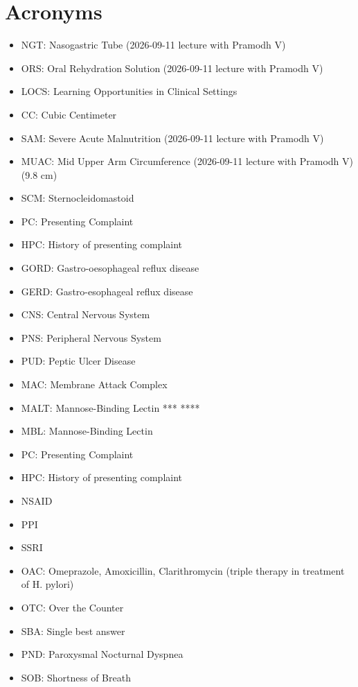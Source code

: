 \chapter{Acronyms}

\begin{itemize}
    \item NGT: Nasogastric Tube (2026-09-11 lecture with Pramodh V)
    \item ORS: Oral Rehydration Solution (2026-09-11 lecture with Pramodh V)
    \item LOCS: Learning Opportunities in Clinical Settings
    \item CC: Cubic Centimeter
    \item SAM: Severe Acute Malnutrition (2026-09-11 lecture with Pramodh V)
    \item MUAC: Mid Upper Arm Circumference (2026-09-11 lecture with Pramodh V) (9.8 cm)
    \item SCM: Sternocleidomastoid %
    \item PC: Presenting Complaint
    \item HPC: History of presenting complaint
    \item GORD: Gastro-oesophageal reflux disease
    \item GERD: Gastro-esophageal reflux disease
    \item CNS: Central Nervous System
    \item PNS: Peripheral Nervous System
    \item PUD: Peptic Ulcer Disease
    \item MAC: Membrane Attack Complex
    \item MALT: Mannose-Binding Lectin *** ****
    \item MBL: Mannose-Binding Lectin
    \item PC: Presenting Complaint
    \item HPC: History of presenting complaint
    \item NSAID
    \item PPI
    \item SSRI
    \item OAC: Omeprazole, Amoxicillin, Clarithromycin (triple therapy in treatment of H. pylori)
    \item OTC: Over the Counter
    \item SBA: Single best answer
    \item PND: Paroxysmal Nocturnal Dyspnea
    \item SOB: Shortness of Breath

\end{itemize}
